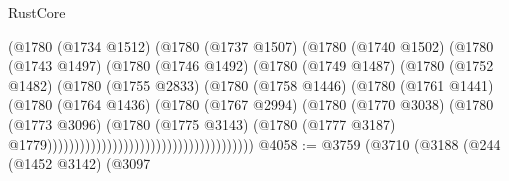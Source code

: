 \begin{lexlean}{RustCore}
\begin{coremodule}
                                                (@1780
                                                  (@1734 @1512)
                                                  (@1780
                                                    (@1737 @1507)
                                                    (@1780
                                                      (@1740 @1502)
                                                      (@1780
                                                        (@1743 @1497)
                                                        (@1780
                                                          (@1746 @1492)
                                                          (@1780
                                                            (@1749 @1487)
                                                            (@1780
                                                              (@1752 @1482)
                                                              (@1780
                                                                (@1755 @2833)
                                                                (@1780
                                                                  (@1758 @1446)
                                                                  (@1780
                                                                    (@1761 @1441)
                                                                    (@1780
                                                                      (@1764 @1436)
                                                                      (@1780
                                                                        (@1767 @2994)
                                                                        (@1780
                                                                          (@1770 @3038)
                                                                          (@1780
                                                                            (@1773 @3096)
                                                                            (@1780
                                                                              (@1775 @3143)
                                                                              (@1780
                                                                                (@1777 @3187)
                                                                                @1779))))))))))))))))))))))))))))))))))))))
@4058 := @3759
    (@3710
      (@3188
        (@244
          (@1452 @3142)
          (@3097

\end{coremodule}
\end{lexlean}
